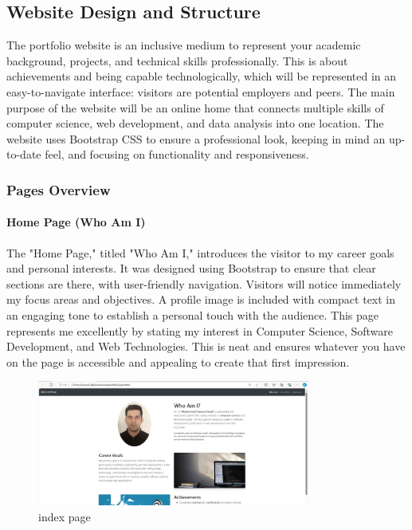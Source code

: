 \documentclass[a4paper,12pt]{article}
\begin{document}
\subsection{Website Design and Structure}
The portfolio website is an inclusive medium to represent your academic background, projects, and technical skills professionally. This is about achievements and being capable technologically, which will be represented in an easy-to-navigate interface: visitors are potential employers and peers. The main purpose of the website will be an online home that connects multiple skills of computer science, web development, and data analysis into one location. The website uses Bootstrap CSS to ensure a professional look, keeping in mind an up-to-date feel, and focusing on functionality and responsiveness.

\subsubsection{Pages Overview}

\paragraph{Home Page (Who Am I)}
The "Home Page," titled "Who Am I," introduces the visitor to my career goals and personal interests. It was designed using Bootstrap to ensure that clear sections are there, with user-friendly navigation. Visitors will notice immediately my focus areas and objectives. A profile image is included with compact text in an engaging tone to establish a personal touch with the audience. This page represents me excellently by stating my interest in Computer Science, Software Development, and Web Technologies. This is neat and ensures whatever you have on the page is accessible and appealing to create that first impression.

\begin{figure}[h!]
    \centering
    \includegraphics[width=0.8\textwidth]{index.jpg} %
    \caption{index page}
\end{figure}
\end{document}

